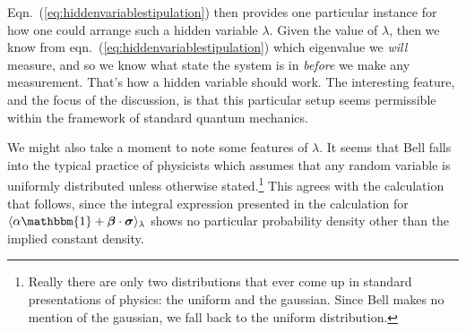 \documentclass[12pt]{article}
\begin{document}
Eqn.~(\ref{eq:hiddenvariablestipulation}) then provides one particular instance for how one could arrange such a hidden variable $\lambda$.  Given the value of $\lambda$, then we know from eqn.~(\ref{eq:hiddenvariablestipulation}) which eigenvalue we \emph{will} measure, and so we know what state the system is in \emph{before} we make any measurement.  That's how a hidden variable should work.  The interesting feature, and the focus of the discussion, is that this particular setup seems permissible within the framework of standard quantum mechanics.

We might also take a moment to note some features of $\lambda$.  It seems that Bell falls into the typical practice of physicists which assumes that any random variable is uniformly distributed unless otherwise stated.\footnote{Really there are only two distributions that ever come up in standard presentations of physics: the uniform and the gaussian.  Since Bell makes no mention of the gaussian, we fall back to the uniform distribution.}  This agrees with the calculation that follows, since the integral expression presented in the calculation for $\langle \alpha \mathbbm{1} + \bm{\beta} \cdot \bm{\sigma} \rangle_{\lambda}$ shows no particular probability density other than the implied constant density.



\end{document}
